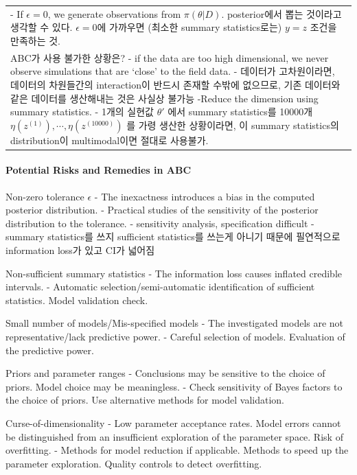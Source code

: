 \documentclass[
]{book}
\begin{document}
\begin{longtable}[]{@{}
  >{\raggedright\arraybackslash}p{}@{}}
- If \(\epsilon=0\), we generate observations from \(\pi(\theta \vert D)\). posterior에서 뽑는 것이라고 생각할 수 있다. \(\epsilon=0\)에 가까우면 (최소한 summary statistics로는) \(y=z\) 조건을 만족하는 것. \\
ABC가 사용 불가한 상황은?
- if the data are too high dimensional, we never observe simulations that are `close' to the field data.
- 데이터가 고차원이라면, 데이터의 차원들간의 interaction이 반드시 존재할 수밖에 없으므로, 기존 데이터와 같은 데이터를 생산해내는 것은 사실상 불가능
-Reduce the dimension using summary statistics.
- 1개의 실현값 \(\theta'\) 에서 summary statistics를 10000개 \(\eta(z^{(1)}), \cdots, \eta(z^{(10000)})\) 를 가령 생산한 상황이라면, 이 summary statistics의 distribution이 multimodal이면 절대로 사용불가. \\
\bottomrule
\end{longtable}

\hypertarget{potential-risks-and-remedies-in-abc}{%
\paragraph{Potential Risks and Remedies in ABC}\label{potential-risks-and-remedies-in-abc}}

Non-zero tolerance \(\epsilon\)
- The inexactness introduces a bias in the computed posterior distribution.
- Practical studies of the sensitivity of the posterior distribution to the tolerance.
- sensitivity analysis, specification difficult
- summary statistics를 쓰지 sufficient statistics를 쓰는게 아니기 때문에 필연적으로 information loss가 있고 CI가 넓어짐

Non-sufficient summary statistics
- The information loss causes inflated credible intervals.
- Automatic selection/semi-automatic identification of sufficient statistics. Model validation check.

Small number of models/Mis-specified models
- The investigated models are not representative/lack predictive power.
- Careful selection of models. Evaluation of the predictive power.

Priors and parameter ranges
- Conclusions may be sensitive to the choice of priors. Model choice may be meaningless.
- Check sensitivity of Bayes factors to the choice of priors. Use alternative methods for model validation.

Curse-of-dimensionality
- Low parameter acceptance rates. Model errors cannot be distinguished from an insufficient exploration of the parameter space. Risk of overfitting.
- Methods for model reduction if applicable. Methods to speed up the parameter exploration. Quality controls to detect overfitting.
\end{document}
